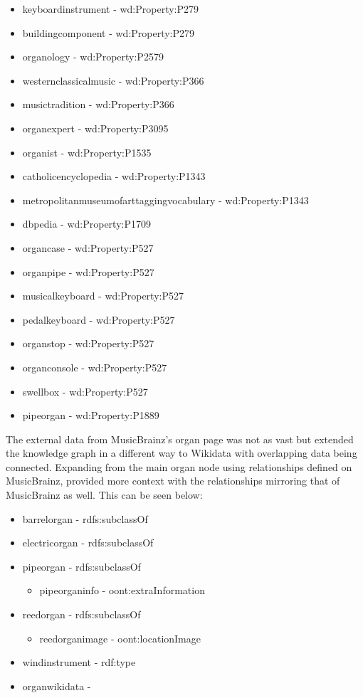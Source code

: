 \begin{itemize}
    \itemsep0em 
    \item keyboardinstrument - wd:Property:P279
    \item buildingcomponent - wd:Property:P279
    \item organology - wd:Property:P2579 
    \item westernclassicalmusic - wd:Property:P366
    \item musictradition - wd:Property:P366
    \item organexpert - wd:Property:P3095
    \item organist - wd:Property:P1535
    \item catholicencyclopedia - wd:Property:P1343
    \item metropolitanmuseumofarttaggingvocabulary - wd:Property:P1343
    \item dbpedia - wd:Property:P1709
    \item organcase - wd:Property:P527
    \item organpipe - wd:Property:P527
    \item musicalkeyboard - wd:Property:P527
    \item pedalkeyboard - wd:Property:P527
    \item organstop - wd:Property:P527
    \item organconsole - wd:Property:P527
    \item swellbox - wd:Property:P527
    \item pipeorgan - wd:Property:P1889
\end{itemize}

The external data from MusicBrainz's organ page \cite{organmusicbrainz} was not as vast but extended the knowledge graph in a different way to Wikidata with overlapping data being connected. Expanding from the main organ node using relationships defined on MusicBrainz, provided more context with the relationships mirroring that of MusicBrainz as well. This can be seen below:

\begin{itemize}
    \itemsep0em 
    \item barrelorgan - rdfs:subclassOf
    \item electricorgan - rdfs:subclassOf
    \item pipeorgan - rdfs:subclassOf
    \begin{itemize}
        \itemsep0em 
        \item pipeorganinfo - oont:extraInformation
    \end{itemize}
    \item reedorgan - rdfs:subclassOf
    \begin{itemize}
        \itemsep0em 
        \item reedorganimage - oont:locationImage
    \end{itemize}
    \item windinstrument - rdf:type
    \item organwikidata - 
\end{itemize}

